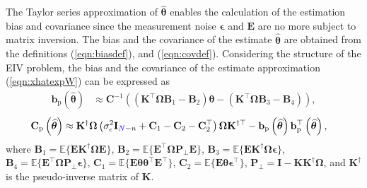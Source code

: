 The Taylor series approximation of $\widehat{\bm{\theta}}$ enables the calculation of the estimation bias and covariance since the measurement noise $\bm{\epsilon}$ and $\mathbf{E}$ are no more subject to matrix inversion. 
The bias and the covariance of the estimate $\widehat{\bm{\theta}}$ are obtained from the definitions (\ref{eqn:biasdef}), and (\ref{eqn:covdef}). %
Considering the structure of the EIV problem, the bias and the covariance of the estimate approximation (\ref{eqn:xhatexpW}) can be expressed as
\begin{equation} \begin{aligned} \mathbf{b}_{\mathrm{p}} \left( \widehat{\bm{\theta}} \right) & \approx \mathbf{C}^{-1} \left(  \left( \mathbf{K}^\top \bm{\Omega} \mathbf{B}_1 - \mathbf{B}_2 \right) \bm{\theta} - \left( \mathbf{K}^\top \bm{\Omega} \mathbf{B}_3 - \mathbf{B}_4 \right) \right), \end{aligned} \label{eqn:biasEW} \end{equation}
\begin{equation} \begin{aligned} \mathbf{C}_{\mathrm{p}} \left( \widehat{\bm{\theta}} \right) & \approx \mathbf{K}^\dagger \bm{\Omega} \left( \sigma_{\epsilon}^2 \mathbf{I}_{\color{blue}N\color{black}-n} + \mathbf{C}_1 - \mathbf{C}_2 - \mathbf{C}_2^\top \right) \bm{\Omega} \mathbf{K}^{\dagger \top} - \mathbf{b}_{\mathrm{p}} \left( \widehat{\bm{\theta}} \right) \mathbf{b}_{\mathrm{p}}^\top \left( \widehat{\bm{\theta}} \right), \end{aligned} \label{eqn:varEW} \end{equation}
where $\mathbf{B}_1 = \mathbb{E} \Big\{ \mathbf{E} \mathbf{K}^\dagger \bm{\Omega} \mathbf{E} \Big\}$, $\mathbf{B}_2 = \mathbb{E} \Big\{ \mathbf{E}^\top \bm{\Omega} \mathbf{P}_\perp \mathbf{E} \Big\}$, $\mathbf{B}_3 = \mathbb{E} \Big\{ \mathbf{E} \mathbf{K}^\dagger \bm{\Omega} \bm{\epsilon} \Big\}$, $\mathbf{B}_4 = \mathbb{E} \Big\{ \mathbf{E}^\top \bm{\Omega} \mathbf{P}_\perp \bm{\epsilon} \Big\}$, $\mathbf{C}_1 = \mathbb{E} \Big\{ \mathbf{E} \bm{\theta} \bm{\theta}^\top \mathbf{E}^\top \Big\}$, $\mathbf{C}_2 = \mathbb{E} \Big\{ \mathbf{E} \bm{\theta} \bm{\epsilon}^\top \Big\}$, $\mathbf{P}_\perp = \mathbf{I} - \mathbf{K} \mathbf{K}^\dagger \bm{\Omega}$, and $\mathbf{K}^\dagger$ is the pseudo-inverse matrix of $\mathbf{K}$. 

